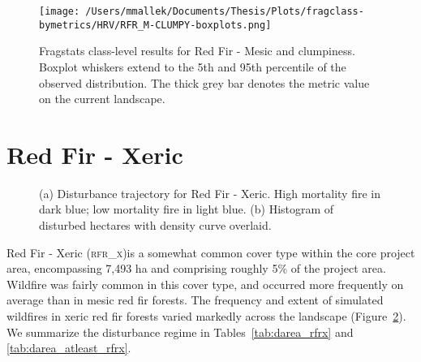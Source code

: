 \begin{figure}[!htbp]
\centering
    \texttt{[image: /Users/mmallek/Documents/Thesis/Plots/fragclass-bymetrics/HRV/RFR\_M-CLUMPY-boxplots.png]}
  \caption{Fragstats class-level results for Red Fir - Mesic and clumpiness. Boxplot whiskers extend to the 5th and 95th percentile of the observed distribution. The thick grey bar denotes the metric value on the current landscape.}
  \label{fig:rfrm_clumpy}
\end{figure}


\clearpage
\section{Red Fir - Xeric} 

\begin{figure}[!htbp]
  \centering
  \caption{\small (a) Disturbance trajectory for Red Fir - Xeric. High mortality fire in dark blue; low mortality fire in light blue. (b) Histogram of disturbed hectares with density curve overlaid.} 
  \label{fig:darea_rfrx}
\end{figure}

Red Fir - Xeric (\textsc{rfr\_x})is a somewhat common cover type within the core project area, encompassing 7,493 ha and comprising roughly 5\% of the project area. Wildfire was fairly common in this cover type, and occurred more frequently on average than in mesic red fir forests.
The frequency and extent of simulated wildfires in xeric red fir forests varied markedly across the landscape (Figure~\ref{fig:darea_rfrx}). We summarize the disturbance regime in Tables~\ref{tab:darea_rfrx} and \ref{tab:darea_atleast_rfrx}.


